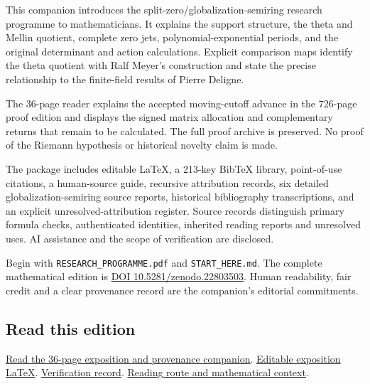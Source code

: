 \documentclass[
]{article}
\begin{document}
This companion introduces the split-zero/globalization-semiring research
programme to mathematicians. It explains the support structure, the
theta and Mellin quotient, complete zero jets, polynomial-exponential
periods, and the original determinant and action calculations. Explicit
comparison maps identify the theta quotient with Ralf Meyer's
construction and state the precise relationship to the finite-field
results of Pierre Deligne.

The 36-page reader explains the accepted moving-cutoff advance in the
726-page proof edition and displays the signed matrix allocation and
complementary returns that remain to be calculated. The full proof
archive is preserved. No proof of the Riemann hypothesis or historical
novelty claim is made.

The package includes editable LaTeX, a 213-key BibTeX library,
point-of-use citations, a human-source guide, recursive attribution
records, six detailed globalization-semiring source reports, historical
bibliography transcriptions, and an explicit unresolved-attribution
register. Source records distinguish primary formula checks,
authenticated identities, inherited reading reports and unresolved uses.
AI assistance and the scope of verification are disclosed.

Begin with \texttt{RESEARCH\_PROGRAMME.pdf} and \texttt{START\_HERE.md}.
The complete mathematical edition is
\href{https://doi.org/10.5281/zenodo.22803503}{DOI
10.5281/zenodo.22803503}. Human readability, fair credit and a clear
provenance record are the companion's editorial commitments.

\subsection{Read this edition}\label{read-this-edition-2}

\href{https://github.com/KokunoYumeto/zeta-function-research-reader/blob/main/workbenches/splitzero-tandem/continuations/20260917-exposition-provenance/RESEARCH_PROGRAMME.pdf}{Read
the 36-page exposition and provenance companion}.
\href{https://github.com/KokunoYumeto/zeta-function-research-reader/blob/main/workbenches/splitzero-tandem/continuations/20260917-exposition-provenance/RESEARCH_PROGRAMME.tex}{Editable
exposition LaTeX}.
\href{https://github.com/KokunoYumeto/zeta-function-research-reader/blob/main/workbenches/splitzero-tandem/continuations/20260917-exposition-provenance/COVERAGE.md}{Verification
record}.
\href{https://github.com/KokunoYumeto/zeta-function-research-reader/blob/main/workbenches/splitzero-tandem/continuations/20260917-exposition-provenance/START_HERE.md}{Reading
route and mathematical context}.
\end{document}
